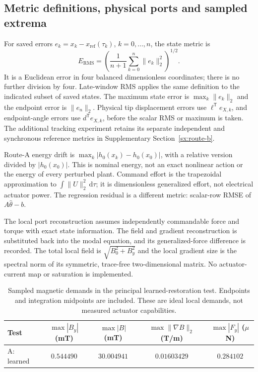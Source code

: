 \subsection{Metric definitions, physical ports and sampled extrema}
\label{sx:metrics}
For saved errors $e_k=x_k-x_{\mathrm{ref}}(\tau_k)$, $k=0,\ldots,n$,
the state metric is
\begin{equation}
 E_{\mathrm{RMS}}=
 \left(\frac1{n+1}\sum_{k=0}^{n}\|e_k\|_2^2\right)^{1/2}.
 \label{sx:rms}
\end{equation}
It is a Euclidean error in four balanced dimensionless coordinates;
there is no further division by four. Late-window RMS applies the
same definition to the indicated subset of saved states. The maximum
state error is $\max_k\|e_k\|_2$ and the endpoint error is $\|e_n\|_2$.
Physical tip displacement errors use $\ell^{\mathsf T}e_{X,k}$,
and endpoint-angle errors use $d^{\mathsf T}e_{X,k}$, before the
scalar RMS or maximum is taken. The additional tracking experiment retains its separate independent and
synchronous reference metrics in Supplementary Section~\ref{sx:route-b}.

Route-A energy drift is
$\max_k|h_0(x_k)-h_0(x_0)|$, with a relative version divided by
$|h_0(x_0)|$. This is nominal energy, not an exact nonlinear action
or the energy of every perturbed plant. Command effort is the
trapezoidal approximation to $\int\|U\|_2^2\,\mathrm d\tau$;
it is dimensionless generalized effort, not electrical actuator
power. The regression residual is a different metric: scalar-row
RMSE of $A\widehat\theta-b$.

The local port reconstruction assumes independently commandable
force and torque with exact state information. The field and
gradient reconstruction is substituted back into the modal
equation, and its generalized-force difference is recorded.
The total local field is $\sqrt{B_0^2+B_y^2}$ and the local gradient
size is the spectral norm of its symmetric, trace-free two-dimensional
matrix. No actuator-current map or saturation is implemented.

\begin{table}[t]
\centering
\caption{Sampled magnetic demands in the principal learned-restoration
test. Endpoints and integration midpoints are included. These are
ideal local demands, not measured actuator capabilities.}
\label{sx:port-table}
\begin{tabular}{lcccc}
\toprule
Test & $\max|B_y|$ (mT) & $\max|B|$ (mT) & $\max\|\nabla B\|_2$ (T/m) & $\max|F_y|$ ($\mu$N)\\
\midrule
A: learned & $0.544490$ & $30.004941$ & $0.01603429$ & $0.284102$ \\
\bottomrule
\end{tabular}
\end{table}

